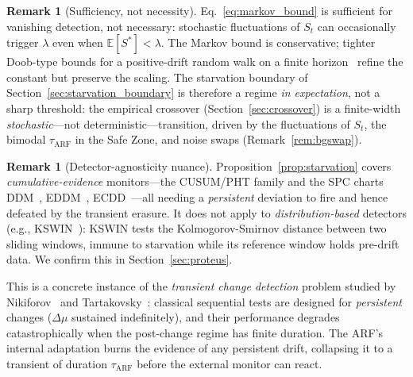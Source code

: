 \documentclass[10pt,conference]{IEEEtran}
\theoremstyle{definition}
\newtheorem{remark}[theorem]{Remark}
\begin{document}
\begin{remark}[Sufficiency, not necessity]\label{rem:sufficient}
  Eq.~\eqref{eq:markov_bound} is sufficient for vanishing detection, not necessary: stochastic fluctuations of $S_t$ can occasionally trigger $\lambda$ even when $\mathbb{E}[S^*] < \lambda$. The Markov bound is conservative; tighter Doob-type bounds for a positive-drift random walk on a finite horizon~\cite{tartakovsky_2014} refine the constant but preserve the scaling. The starvation boundary of Section~\ref{sec:starvation_boundary} is therefore a regime \emph{in expectation}, not a sharp threshold: the empirical crossover (Section~\ref{sec:crossover}) is a finite-width \emph{stochastic}---not deterministic---transition, driven by the fluctuations of $S_t$, the bimodal $\tau_{\mathrm{ARF}}$ in the Safe Zone, and noise swaps (Remark~\ref{rem:bgswap}).
\end{remark}

\begin{remark}[Detector-agnosticity nuance]\label{rem:agnostic}
  Proposition~\ref{prop:starvation} covers \emph{cumulative-evidence} monitors---the CUSUM/PHT family and the SPC charts DDM~\cite{gama_ddm_2004}, EDDM~\cite{baena_eddm_2006}, ECDD~\cite{ross_ecdd_2012}---all needing a \emph{persistent} deviation to fire and hence defeated by the transient erasure. It does not apply to \emph{distribution-based} detectors (e.g., KSWIN~\cite{raab_kswin_2020}): KSWIN tests the Kolmogorov-Smirnov distance between two sliding windows, immune to starvation while its reference window holds pre-drift data. We confirm this in Section~\ref{sec:proteus}.
\end{remark}

This is a concrete instance of the \emph{transient change detection} problem studied by Nikiforov~\cite{nikiforov_2012} and Tartakovsky~\cite{tartakovsky_2023_transient}: classical sequential tests are designed for \emph{persistent} changes ($\Delta\mu$ sustained indefinitely), and their performance degrades catastrophically when the post-change regime has finite duration.
The ARF's internal adaptation burns the evidence of any persistent drift, collapsing it to a transient of duration $\tau_{\mathrm{ARF}}$ before the external monitor can react.
\end{document}
